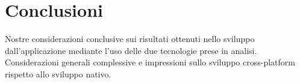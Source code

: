 \chapter{Conclusioni}
	Nostre considerazioni conclusive sui risultati ottenuti nello sviluppo 
	dall'applicazione mediante l'uso delle due tecnologie prese in analisi. 
	Considerazioni generali complessive e impressioni sullo sviluppo 
	cross-platform rispetto allo sviluppo nativo.